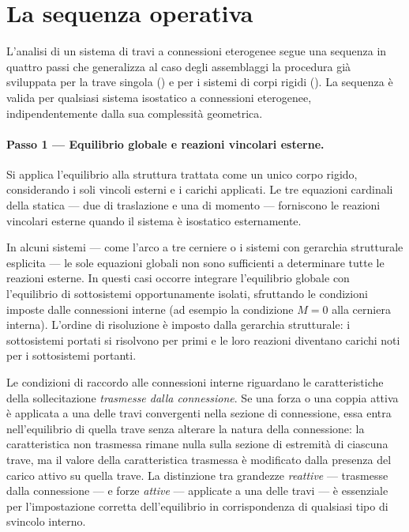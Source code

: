\section{La sequenza operativa}
\label{sec:sequenza_operativa}

L'analisi di un sistema di travi a connessioni
eterogenee segue una sequenza in quattro passi che
generalizza al caso degli assemblaggi la procedura
già sviluppata per la trave singola
() e per i sistemi di
corpi rigidi ().
La sequenza è valida per qualsiasi sistema isostatico
a connessioni eterogenee, indipendentemente dalla
sua complessità geometrica.

\paragraph{Passo 1 --- Equilibrio globale e
	reazioni vincolari esterne.}

Si applica l'equilibrio alla struttura trattata
come un unico corpo rigido, considerando i soli
vincoli esterni e i carichi applicati. Le tre
equazioni cardinali della statica --- due di
traslazione e una di momento --- forniscono le
reazioni vincolari esterne quando il sistema è
isostatico esternamente.

In alcuni sistemi --- come l'arco a tre cerniere
o i sistemi con gerarchia strutturale esplicita
--- le sole equazioni globali non sono sufficienti
a determinare tutte le reazioni esterne. In questi
casi occorre integrare l'equilibrio globale con
l'equilibrio di sottosistemi opportunamente isolati,
sfruttando le condizioni imposte dalle connessioni
interne (ad esempio la condizione $M = 0$ alla
cerniera interna). L'ordine di risoluzione è
imposto dalla gerarchia strutturale: i sottosistemi
portati si risolvono per primi e le loro reazioni
diventano carichi noti per i sottosistemi portanti.

\begin{oss}
	Le condizioni di raccordo alle connessioni
	interne riguardano le caratteristiche della
	sollecitazione \emph{trasmesse dalla
		connessione}. Se una forza o una coppia
	attiva è applicata a una delle travi
	convergenti nella sezione di connessione,
	essa entra nell'equilibrio di quella trave
	senza alterare la natura della connessione:
	la caratteristica non trasmessa rimane nulla
	sulla sezione di estremità di ciascuna trave,
	ma il valore della caratteristica trasmessa
	è modificato dalla presenza del carico attivo
	su quella trave. La distinzione tra grandezze
	\emph{reattive} --- trasmesse dalla connessione
	--- e forze \emph{attive} --- applicate a una
	delle travi --- è essenziale per l'impostazione
	corretta dell'equilibrio in corrispondenza
	di qualsiasi tipo di svincolo interno.
\end{oss}

